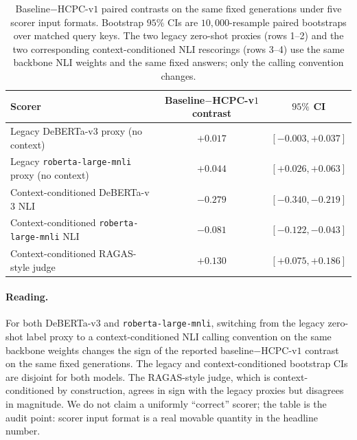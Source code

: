 \begin{table}[!htb]
\centering
\caption{Baseline$-$HCPC-v$1$ paired contrasts on the same fixed
generations under five scorer input formats. Bootstrap $95\%$ CIs are
$10{,}000$-resample paired bootstraps over matched query keys. The
two legacy zero-shot proxies (rows 1--2) and the two corresponding
context-conditioned NLI rescorings (rows 3--4) use the same backbone
NLI weights and the same fixed answers; only the calling convention
changes.}
\label{tab:supp:context_conditioned_contrasts}
\footnotesize
\begin{tabular}{lcc}
\toprule
Scorer & Baseline$-$HCPC-v$1$ contrast & $95\%$ CI \\
\midrule
Legacy DeBERTa-v$3$ proxy (no context)            & $+0.017$ & $[-0.003, +0.037]$ \\
Legacy \texttt{roberta-large-mnli} proxy (no context) & $+0.044$ & $[+0.026, +0.063]$ \\
\addlinespace
Context-conditioned DeBERTa-v$3$ NLI              & $-0.279$ & $[-0.340, -0.219]$ \\
Context-conditioned \texttt{roberta-large-mnli} NLI & $-0.081$ & $[-0.122, -0.043]$ \\
\addlinespace
Context-conditioned RAGAS-style judge             & $+0.130$ & $[+0.075, +0.186]$ \\
\bottomrule
\end{tabular}
\end{table}

\paragraph{Reading.} For both DeBERTa-v$3$ and
\texttt{roberta-large-mnli}, switching from the legacy zero-shot label
proxy to a context-conditioned NLI calling convention on the same
backbone weights changes the sign of the reported baseline$-$HCPC-v$1$
contrast on the same fixed generations. The legacy and
context-conditioned bootstrap CIs are disjoint for both models. The
RAGAS-style judge, which is context-conditioned by construction,
agrees in sign with the legacy proxies but disagrees in magnitude. We
do not claim a uniformly ``correct'' scorer; the table is the audit
point: scorer input format is a real movable quantity in the headline
number.

